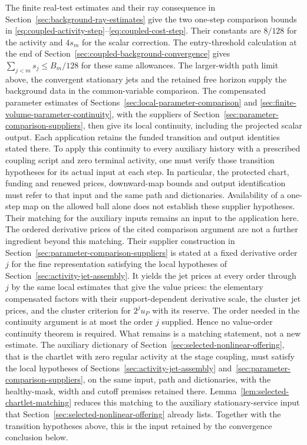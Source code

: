 The finite real-test estimates and their ray consequence in
Section~\ref{sec:background-ray-estimates} give the two one-step
comparison bounds in
\eqref{eq:coupled-activity-step}--\eqref{eq:coupled-cost-step}.
Their constants are $8/128$ for the activity and $4s_m$ for the
scalar correction. The entry-threshold calculation at the end of
Section~\ref{sec:coupled-background-convergence} gives
$\sum_{j<m}s_j\le B_m/128$ for these same allowances. The
larger-width path limit above, the convergent stationary jets and
the retained free horizon supply the background data in the
common-variable comparison. The compensated parameter estimates
of Sections~\ref{sec:local-parameter-comparison} and
\ref{sec:finite-volume-parameter-continuity}, with the suppliers
of Section~\ref{sec:parameter-comparison-suppliers}, then give its
local continuity, including the projected scalar output. Each
application retains the funded transition and output identities
stated there. To apply this continuity to every auxiliary history
with a prescribed coupling script and zero terminal activity, one
must verify those transition hypotheses for its actual input at each
step. In particular, the protected chart, funding and renewed prices,
downward-map bounds and output identification must refer to that input
and the same path and dictionaries. Availability of a one-step map on
the allowed ball alone does not establish these supplier hypotheses.
Their matching for the auxiliary inputs remains an input to the
application here.
The ordered derivative prices of the cited comparison argument are
not a further ingredient beyond this matching. Their supplier
construction in Section~\ref{sec:parameter-comparison-suppliers} is
stated at a fixed derivative order $j$ for the fine representation
satisfying the local hypotheses of Section~\ref{sec:activity-jet-assembly}.
It yields the jet prices at every order through $j$ by the same local
estimates that give the value prices: the elementary compensated
factors with their support-dependent derivative scale, the cluster jet
prices, and the cluster criterion for $2^ju_P$ with its reserve. The
order needed in the continuity argument is at most the order $j$
supplied. Hence no value-order continuity theorem is required. What
remains is a matching statement, not a new estimate. The auxiliary
dictionary of Section~\ref{sec:selected-nonlinear-offering}, that is
the chartlet with zero regular activity at the stage coupling, must
satisfy the local hypotheses of
Sections~\ref{sec:activity-jet-assembly}
and~\ref{sec:parameter-comparison-suppliers}, on the same input, path
and dictionaries, with the healthy-mask, width and cutoff premises
retained there. Lemma~\ref{lem:selected-chartlet-matching} reduces
this matching to the auxiliary stationary-service input that
Section~\ref{sec:selected-nonlinear-offering} already lists. Together
with the transition hypotheses above, this is the input retained by the
convergence conclusion below.

